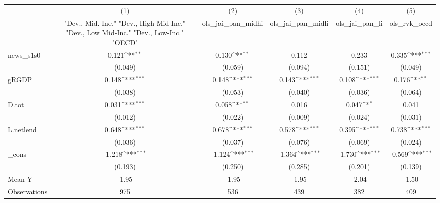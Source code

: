 {
\def\sym#1{\ifmmode^{#1}\else\(^{#1}\)\fi}
\begin{tabular}{l*{5}{c}}
\toprule
            &\multicolumn{1}{c}{(1)}&\multicolumn{1}{c}{(2)}&\multicolumn{1}{c}{(3)}&\multicolumn{1}{c}{(4)}&\multicolumn{1}{c}{(5)}\\
            &\multicolumn{1}{c}{ "Dev., Mid.-Inc." "Dev., High Mid-Inc." "Dev., Low Mid-Inc." "Dev., Low-Inc." "OECD" }&\multicolumn{1}{c}{ols\_jai\_pan\_midhi}&\multicolumn{1}{c}{ols\_jai\_pan\_midli}&\multicolumn{1}{c}{ols\_jai\_pan\_li}&\multicolumn{1}{c}{ols\_rvk\_oecd}\\
\midrule
news\_s1s0   &       0.121\sym{**} &       0.130\sym{**} &       0.112         &       0.233         &       0.335\sym{***}\\
            &     (0.049)         &     (0.059)         &     (0.094)         &     (0.151)         &     (0.049)         \\
\addlinespace
gRGDP       &       0.148\sym{***}&       0.148\sym{***}&       0.143\sym{***}&       0.108\sym{***}&       0.176\sym{**} \\
            &     (0.038)         &     (0.053)         &     (0.040)         &     (0.036)         &     (0.064)         \\
\addlinespace
D.tot       &       0.031\sym{***}&       0.058\sym{**} &       0.016         &       0.047\sym{*}  &       0.041         \\
            &     (0.012)         &     (0.022)         &     (0.009)         &     (0.024)         &     (0.031)         \\
\addlinespace
L.netlend   &       0.648\sym{***}&       0.678\sym{***}&       0.578\sym{***}&       0.395\sym{***}&       0.738\sym{***}\\
            &     (0.036)         &     (0.037)         &     (0.076)         &     (0.069)         &     (0.024)         \\
\addlinespace
\_cons      &      -1.218\sym{***}&      -1.124\sym{***}&      -1.364\sym{***}&      -1.730\sym{***}&      -0.569\sym{***}\\
            &     (0.193)         &     (0.250)         &     (0.285)         &     (0.201)         &     (0.139)         \\
\midrule
Mean Y      &       -1.95         &       -1.95         &       -1.95         &       -2.04         &       -1.50         \\
Observations&         975         &         536         &         439         &         382         &         409         \\
\bottomrule
\end{tabular}
}
